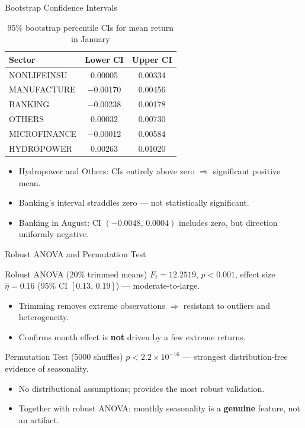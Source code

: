 \documentclass[10pt, aspectratio=169]{beamer}
\begin{document}
\begin{frame}{Bootstrap Confidence Intervals}
\begin{table}
\centering
\caption{95\% bootstrap percentile CIs for mean return in January \cite{efron1994introduction}}
\small
\begin{tabular}{lcc}
\toprule
Sector & Lower CI & Upper CI \\
\midrule
NONLIFEINSU  & 0.00005  & 0.00334 \\
MANUFACTURE  & $-$0.00170 & 0.00456 \\
BANKING      & $-$0.00238 & 0.00178 \\
OTHERS       & 0.00032  & 0.00730 \\
MICROFINANCE & $-$0.00012 & 0.00584 \\
HYDROPOWER   & 0.00263  & 0.01020 \\
\bottomrule
\end{tabular}
\end{table}
\begin{itemize}
    \item Hydropower and Others: CIs entirely above zero $\Rightarrow$ significant positive mean.
    \item Banking's interval straddles zero --- not statistically significant.
    \item Banking in August: CI $(-0.0048,\, 0.0004)$ includes zero, but direction uniformly negative.
\end{itemize}
\end{frame}

\begin{frame}{Robust ANOVA and Permutation Test}
\begin{block}{Robust ANOVA (20\% trimmed means) \cite{wilcox2017introduction}}
$F_t = 12.2519$, $p < 0.001$, effect size $\hat{\eta} = 0.16$ (95\% CI $[0.13,\, 0.19]$) --- moderate-to-large.
\end{block}
\begin{itemize}
    \item Trimming removes extreme observations $\Rightarrow$ resistant to outliers and heterogeneity.
    \item Confirms month effect is \textbf{not} driven by a few extreme returns.
\end{itemize}
\vspace{0.3cm}
\begin{block}{Permutation Test (5000 shuffles) \cite{good2005permutation}}
$p < 2.2\times10^{-16}$ --- strongest distribution-free evidence of seasonality.
\end{block}
\begin{itemize}
    \item No distributional assumptions; provides the most robust validation.
    \item Together with robust ANOVA: monthly seasonality is a \textbf{genuine} feature, not an artifact.
\end{itemize}
\end{frame}
\end{document}
